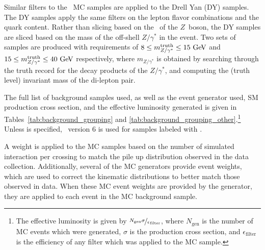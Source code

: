 Similar filters to the \ZGAMMAJETS\ MC samples are applied to the Drell Yan (DY)
samples.
The DY samples apply the same filters on the lepton flavor combinations
and the quark content.
Rather than slicing based on the \pt\ of the $Z$~boson, the DY samples are
sliced based on the mass of the off-shell $Z/\gamma^{*}$ in the event.
Two sets of samples are produced with requirements of
$8 \leq m_{Z/\gamma^{*}}^\mathrm{truth} \leq 15 \GeV$ and 
$15 \leq m_{Z/\gamma^{*}}^\mathrm{truth} \leq 40 \GeV$ respectively, where
$m_{Z/\gamma^{*}}$ is obtained by searching through the truth record for the
decay products of the $Z/\gamma^{*}$, and computing the (truth level) invariant
mass of the di-lepton pair.

The full list of background samples used, as well as the event generator used,
SM production cross section, and the effective luminosity generated is given in 
Tables~\ref{tab:background_grouping}
and \ref{tab:background_grouping_other}.\footnote{The effective luminosity is
given by $\nicefrac{N_\mathrm{gen}\sigma}{\epsilon_\mathrm{filter}}$, where
$N_\mathrm{gen}$ is the number of MC events which were generated, $\sigma$ is
the production cross section, and $\epsilon_\mathrm{filter}$ is the efficiency
of any filter which was applied to the MC sample.}
Unless  is specified, \pythia\ version 6 is used for samples labeled
with \pythia.

A weight is applied to the MC samples based on the number of simulated
interaction per crossing to match the pile up distribution observed in the
data collection.
Additionally, several of the MC generators provide event weights, which are
used to correct the kinematic distributions to better match those observed in
data.
When these MC event weights are provided by the generator, they are applied to
each event in the MC background sample.

